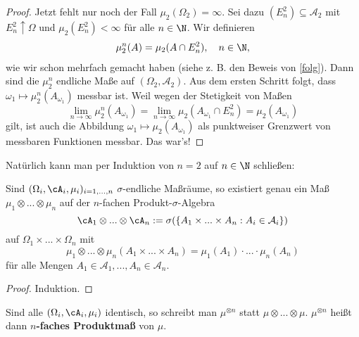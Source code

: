 \begin{proof}
		Jetzt fehlt nur noch der Fall $\mu_2(\Omega_2)=\infty$. Sei dazu $(E^2_n)\subseteq \mathcal A_2$ mit $E^2_n\uparrow \Omega$ und $\mu_2(E^2_n)<\infty$ f\"ur alle $n\in\N$. Wir definieren 
		\begin{align*}
			\mu_2^n(A)=\mu_2(A\cap E^2_n), \quad n\in\N,
		\end{align*}
		wie wir schon mehrfach gemacht haben (siehe z. B. den Beweis von \ref{folg}). Dann sind die $\mu_2^n$ endliche Ma\ss e auf $(\Omega_2, \mathcal A_2)$. Aus dem ersten Schritt folgt, dass $\omega_1\mapsto \mu_2^n(A_{\omega_1})$ messbar ist. Weil wegen der Stetigkeit von Ma\ss en  $$\lim_{n\to\infty} \mu_2^n(A_{\omega_1})= \lim_{n\to\infty} \mu_2(A_{\omega_1}\cap E^2_n)=\mu_2(A_{\omega_1})$$ gilt, ist auch die Abbildung $\omega_1\mapsto \mu_2(A_{\omega_1})$ als punktweiser Grenzwert von messbaren Funktionen messbar. Das war's!
\end{proof}
Nat\"urlich kann man per Induktion von $n=2$ auf $n\in\N$ schlie\ss en:
\begin{korollar}\label{MassraeumeExMass}
	Sind $(\Omega_i, \cA_i, \mu_i)_{i=1,...,n}$ $\sigma$-endliche Maßräume, so existiert genau ein Maß $\mu_1 \otimes ... \otimes \mu_n$ auf der $n$-fachen Produkt-$\sigma$-Algebra $$\cA_1 \otimes ... \otimes \cA_n:=\sigma(\{ A_1\times ... \times A_n: A_i\in \mathcal A_i\})$$ auf $\Omega_1 \times ... \times\Omega_n $ mit $$\mu_1\otimes ... \otimes \mu_n(A_1\times ... \times A_n) = \mu_1 (A_1) \cdot ... \cdot \mu_n(A_n)$$
f\"ur alle Mengen $A_1\in \mathcal A_1,..., A_n\in \mathcal A_n$.
\end{korollar}

\begin{proof}
	Induktion.
\end{proof}

\begin{deff}
	Sind alle $(\Omega_i, \cA_i, \mu_i)$ identisch, so schreibt man $\mu^{\otimes n}$ statt $\mu \otimes ... \otimes \mu$. $\mu^{\otimes n}$ heißt dann \textbf{$n$-faches Produktmaß} von $\mu$.
\end{deff}
\marginpar{\textcolor{red}{Vorlesung 16}}


